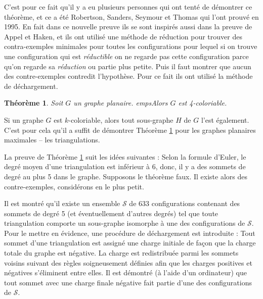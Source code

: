 \documentclass[10pt,a4paper]{article}
\newtheorem{theorem}{Théorème}
\newtheorem{proposition}{Proposition}
\begin{document}
C'est pour ce fait qu'il y a eu plusieurs personnes qui ont tenté de démontrer ce théorème, et ce a été Robertson, Sanders, Seymour et Thomas qui l'ont prouvé en 1995. En fait dans ce nouvelle preuve ils se sont inspirés aussi dans la preuve de Appel et Haken, et ils ont utilisé une méthode de réduction pour trouver des contra-exemples minimales pour toutes les configurations pour lequel si on trouve une configuration qui est \emph{réductible} on ne regarde pas cette configuration parce qu'on regarde sa \emph{réduction} ou partie plus petite. Puis il faut montrer que aucun des contre-exemples contredit l'hypothèse. Pour ce fait ils ont utilisé la méthode de déchargement. 

\begin{theorem}
Soit $G$ un graphe planaire. empsAlors $G$ est 4-coloriable.
\label{th:4CT}
\end{theorem}

Si un graphe $G$ est $k$-coloriable, alors tout sous-graphe $H$ de $G$ l'est également. C'est pour cela qu'il a suffit de démontrer Théorème \ref{th:4CT} pour les graphes planaires maximales -- les triangulations.




La preuve de Théorème \ref{th:4CT} suit les idées suivantes : Selon la formule d'Euler, le degré moyen d'une triangulation est inférieur à 6, donc, il y a des sommets de degré au plus 5 dans le graphe. Supposons le théorème faux. Il existe alors des contre-exemples, considérons en le plus petit. 

Il est montré qu'il existe un ensemble $\mathcal{S}$ de 633 configurations contenant des sommets de degré 5 (et éventuellement d'autres degrés) tel que toute triangulation comporte un sous-graphe isomorphe à une des configurations de $\mathcal{S}$. Pour le mettre en évidence, une procédure de déchargement est introduite : Tout sommet d'une triangulation est assigné une charge initiale de façon que la charge totale du graphe est négative. La charge est redistribuée parmi les sommets voisins suivant des règles soigneusement définies afin que les charges positives et négatives s'éliminent entre elles. Il est démontré (à l'aide d'un ordinateur) que tout sommet avec une charge finale négative fait partie d'une des configurations de $\mathcal{S}$.
\end{document}
